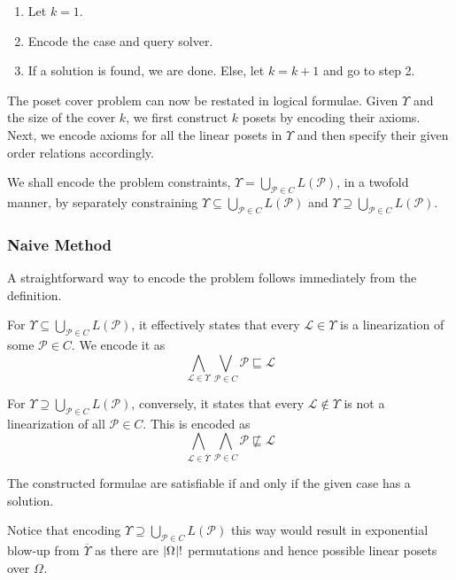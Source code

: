 \documentclass[12pt]{llncs}
\DeclarePairedDelimiter{\abs}{\lvert}{\rvert}
\newcommand{\poset}[1]{\mathcal{#1}}
\newcommand{\uni}[1][]{\Omega_{#1}}
\newcommand{\lang}[1]{L(#1)}
\newcommand{\lext}{\sqsubseteq}
\newcommand{\complmt}[1]{\overline{#1}}
\begin{document}
\begin{enumerate}
    \item Let $k = 1$.
    \item Encode the case and query solver.
    \item If a solution is found, we are done. Else, let $k = k+1$ and go to step 2.
\end{enumerate}

The poset cover problem can now be restated in logical formulae. Given $\Upsilon$ and the size of the cover $k$, we first construct $k$ posets by encoding their axioms. Next, we encode axioms for all the linear posets in $\Upsilon$ and then specify their given order relations accordingly.

We shall encode the problem constraints, $\Upsilon = \bigcup_{\poset{P} \in C} \lang{\poset{P}}$, in a twofold manner, by separately constraining $\Upsilon \subseteq \bigcup_{\poset{P} \in C} \lang{\poset{P}}$ and $\Upsilon \supseteq \bigcup_{\poset{P} \in C} \lang{\poset{P}}$.

\subsubsection{Naive Method} A straightforward way to encode the problem follows immediately from the definition.

For $\Upsilon \subseteq \bigcup_{\poset{P} \in C} \lang{\poset{P}}$, it effectively states that every $\poset{L} \!\in\! \Upsilon$ is a linearization of some $\poset{P} \!\in\! C$. We encode it as
\[
\bigwedge_{\poset{L} \in \Upsilon} \bigvee_{\poset{P} \in C} \poset{P} \lext \poset{L}
\]

For $\Upsilon \supseteq \bigcup_{\poset{P} \in C} \lang{\poset{P}}$, conversely, it states that every $\poset{L} \!\not\in\! \Upsilon$ is not a linearization of all $\poset{P} \!\in\! C$. This is encoded as
\[
\bigwedge_{\poset{L} \in \complmt{\Upsilon}} \bigwedge_{\poset{P} \in C} \poset{P} \not\lext \poset{L}
\]

\begin{theorem}
    The constructed formulae are satisfiable if and only if the given case has a solution.
\end{theorem}

Notice that encoding $\Upsilon \supseteq \bigcup_{\poset{P} \in C} \lang{\poset{P}}$ this way would result in exponential blow-up from $\complmt{\Upsilon}$ as there are $\abs{\uni}!$ permutations and hence possible linear posets over $\uni$.
\end{document}
